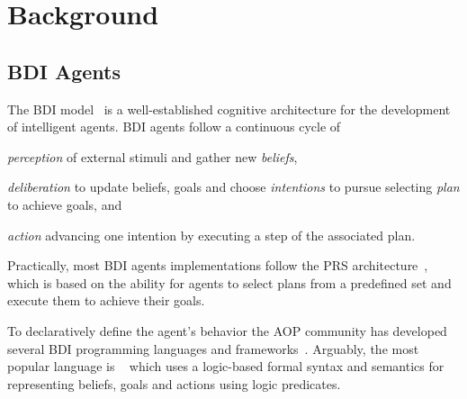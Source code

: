 \documentclass[
]{ceurart}
\begin{document}
\section{Background}
\label{sec:background}

\subsection{BDI Agents}

The \ac{BDI} model~\cite{DBLP:conf/atal/GeorgeffPPTW98}
is a well-established cognitive architecture for the development of intelligent agents.
%
\ac{BDI} agents follow a continuous cycle of
\begin{inlinelist}
  \item \emph{perception} of external stimuli and gather new \emph{beliefs},
  \item \emph{deliberation} to update beliefs, goals and choose \emph{intentions} to pursue selecting \emph{plan} to achieve goals,
  and
  \item \emph{action} advancing one intention by executing a step of the associated plan.
\end{inlinelist}
Practically, most \ac{BDI} agents implementations follow the \ac{PRS} architecture~\cite{georgeff1986pieee},
which is based on the ability for agents to select plans from a predefined set
and execute them to achieve their goals.

To declaratively define the agent's behavior the \ac{AOP} community has developed several \ac{BDI} programming languages and frameworks~\cite{DBLP:conf/woa/MascardiDA05}.
%
Arguably, the most popular language is \agentspeak{}~\cite{DBLP:conf/maamaw/Rao96} which 
uses a logic-based formal syntax and semantics for representing beliefs, goals and actions using logic predicates.
\end{document}
